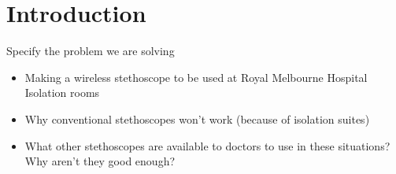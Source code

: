 \chapter{Introduction}
Specify the problem we are solving

\begin{itemize}
	\item Making a wireless stethoscope to be used at Royal Melbourne Hospital Isolation rooms
	\item Why conventional stethoscopes won't work (because of isolation suites)
	\item What other stethoscopes are available to doctors to use in these situations? Why aren't they good enough?
\end{itemize}

